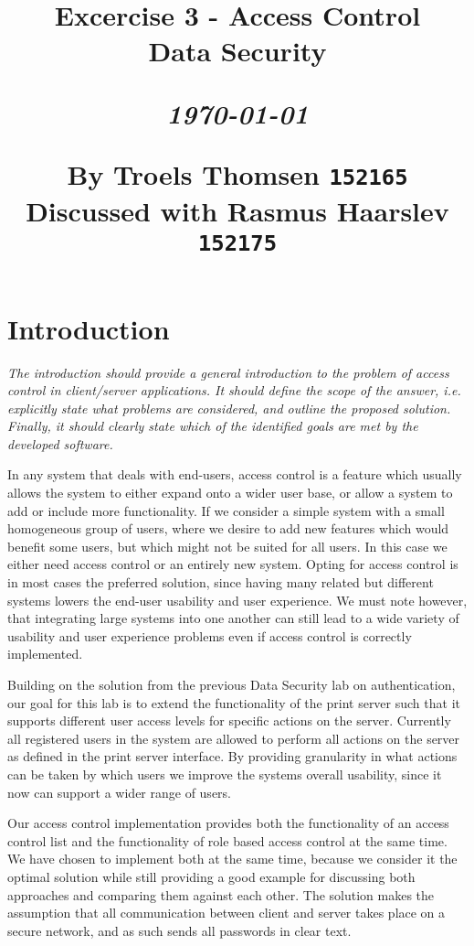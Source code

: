 \documentclass[12pt]{article}
\title{
  \vspace{4cm}
  \begin{flushleft}
  \Large{\textbf{Excercise 3 - Access Control}} \\
  \large{Data Security} \\
  \end{flushleft}
  \vspace{0cm}
  \begin{flushleft}
  \small
  \textit{\today}
  \end{flushleft}
  \vspace{12cm}
  \begin{flushleft}
  \small
  By Troels Thomsen \texttt{152165}\\
  Discussed with Rasmus Haarslev \texttt{152175}
  \end{flushleft}
}
\date{
}
\begin{document}
\clearpage
{}
\thispagestyle{empty}
\maketitle

\newpage

\tableofcontents

\newpage


\section{Introduction}
\label{sec:Introduction}

\textit{The introduction should provide a general introduction to the problem of access control in client/server applications. It should define the scope of the answer, i.e. explicitly state what problems are considered, and outline the proposed solution. Finally, it should clearly state which of the identified goals are met by the developed software.}

In any system that deals with end-users, access control is a feature which usually allows the system to either expand onto a wider user base, or allow a system to add or include more functionality. If we consider a  simple system with a small homogeneous group of users, where we desire to add new features which would benefit some users, but which might not be suited for all users. In this case we either need access control or an entirely new system. Opting for access control is in most cases the preferred solution, since having many related but different systems lowers the end-user usability and user experience. We must note however, that integrating large systems into one another can still lead to a wide variety of usability and user experience problems even if access control is correctly implemented.

Building on the solution from the previous Data Security lab on authentication, our goal for this lab is to extend the functionality of the print server such that it supports different user access levels for specific actions on the server. Currently all registered users in the system are allowed to perform all actions on the server as defined in the print server interface. By providing granularity in what actions can be taken by which users we improve the systems overall usability, since it now can support a wider range of users.

Our access control implementation provides both the functionality of an access control list and the functionality of role based access control at the same time. We have chosen to implement both at the same time, because we consider it the optimal solution while still providing a good example for discussing both approaches and comparing them against each other. The solution makes the assumption that all communication between client and server takes place on a secure network, and as such sends all passwords in clear text.
\end{document}

